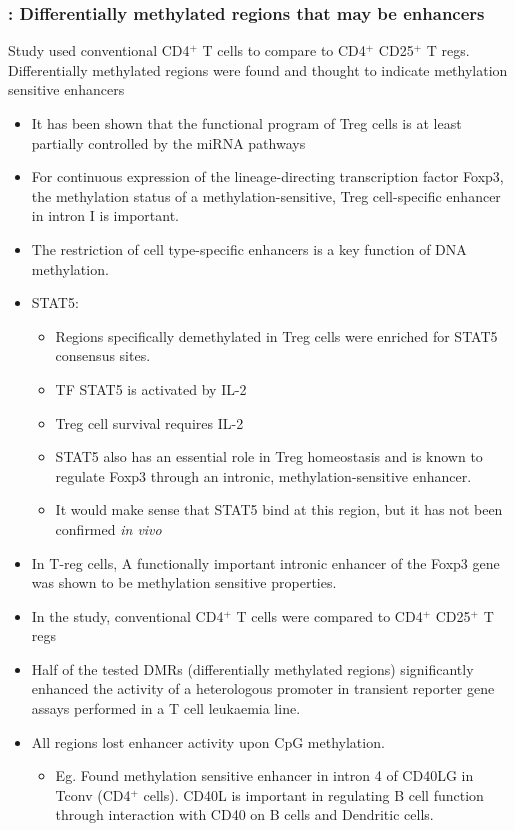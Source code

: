 \documentclass[12pt]{article}
\begin{document}
	\subsubsection{\citeauthor{Schmidl09} \citeyear{Schmidl09}: Differentially methylated regions that may be enhancers}
	
	Study used conventional CD4$^+$ T cells to compare to CD4$^+$ CD25$^+$ T regs. Differentially methylated regions were found and thought to indicate methylation sensitive enhancers
	
	\begin{itemize}
		\item It has been shown that the functional program of Treg cells is at least partially controlled by the miRNA pathways 
		\item For continuous expression of the lineage-directing transcription factor Foxp3, the methylation status of a methylation-sensitive, Treg cell-specific enhancer in intron I is important.
		\item The restriction of cell type-specific enhancers is a key function of DNA methylation. 
		\item STAT5:
		\begin{itemize}
			\item Regions specifically demethylated in Treg cells were enriched for STAT5 consensus sites. 
			\item TF STAT5 is activated by IL-2
			\item Treg cell survival requires IL-2
			\item STAT5 also has an essential role in Treg homeostasis and is known to regulate Foxp3 through an intronic, methylation-sensitive enhancer. 
			\item It would make sense that STAT5 bind at this region, but it has not been confirmed \textit{in vivo}
		\end{itemize}
		\item In T-reg cells, A functionally important intronic enhancer of the Foxp3 gene was shown to be methylation sensitive properties.
		\item In the study, conventional CD4$^+$ T cells were compared to CD4$^+$ CD25$^+$ T regs
		\item Half of the tested DMRs (differentially methylated regions) significantly enhanced the activity of a heterologous promoter in transient reporter gene assays performed in a T cell leukaemia line.
		\item All regions lost enhancer activity upon CpG methylation.
		\begin{itemize}
			\item Eg. Found methylation sensitive enhancer in intron 4 of CD40LG in Tconv (CD4$^+$ cells). CD40L is important in regulating B cell function through interaction with CD40 on B cells and Dendritic cells.
		\end{itemize} 
	\end{itemize}
	
\end{document}
